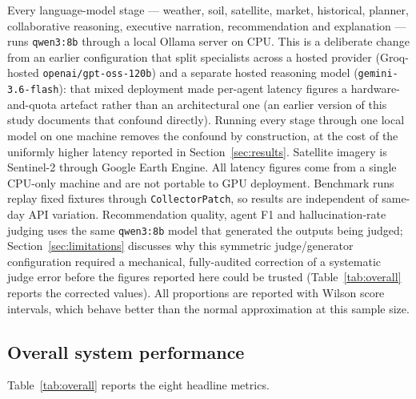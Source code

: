 \documentclass[preprint,12pt]{elsarticle}
\begin{document}
Every language-model stage --- weather, soil, satellite, market,
historical, planner, collaborative reasoning, executive narration,
recommendation and explanation --- runs \texttt{qwen3:8b} through a local
Ollama server on CPU. This is a deliberate change from an earlier
configuration that split specialists across a hosted provider
(Groq-hosted \texttt{openai/gpt-oss-120b}) and a separate hosted
reasoning model (\texttt{gemini-3.6-flash}): that mixed deployment made
per-agent latency figures a hardware-and-quota artefact rather than an
architectural one (an earlier version of this study documents that
confound directly). Running every stage through one local model on one
machine removes the confound by construction, at the cost of the
uniformly higher latency reported in Section~\ref{sec:results}. Satellite
imagery is Sentinel-2 through Google Earth Engine. All latency figures
come from a single CPU-only machine and are not portable to GPU
deployment. Benchmark runs replay fixed fixtures through
\texttt{CollectorPatch}, so results are independent of same-day API
variation. Recommendation quality, agent F1 and hallucination-rate
judging uses the same \texttt{qwen3:8b} model that generated the
outputs being judged; Section~\ref{sec:limitations} discusses why this
symmetric judge/generator configuration required a mechanical,
fully-audited correction of a systematic judge error before the figures
reported here could be trusted (Table~\ref{tab:overall} reports the
corrected values). All proportions are reported with
Wilson score intervals, which behave better than the normal approximation at
this sample size.

\subsection{Overall system performance}

Table~\ref{tab:overall} reports the eight headline metrics.
\end{document}

